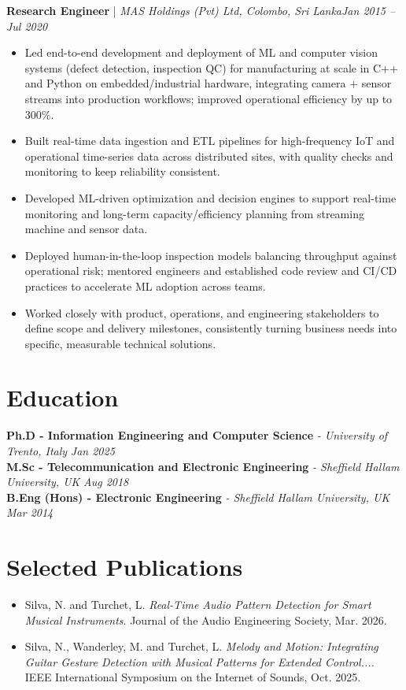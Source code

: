 \documentclass[11pt]{article}
\newenvironment{cvrole}[5]{%
  \par\noindent\textbf{\large #1} | \textit{\small #2, #3}\hfill \textit{\small #4 -- #5}\par
  \begin{itemize}[leftmargin=2em, itemsep=-0.3em, topsep=-0.5em]%
}{%
  \end{itemize}\par\noindent\mbox{}\par\vspace{0.1em}%
}
\begin{document}
\begin{cvrole}{Research Engineer}{MAS Holdings (Pvt) Ltd}{Colombo, Sri Lanka}{Jan 2015}{Jul 2020}
    \item Led end-to-end development and deployment of ML and computer vision systems (defect detection, inspection QC) for manufacturing at scale in C++ and Python on embedded/industrial hardware, integrating camera + sensor streams into production workflows; improved operational efficiency by up to 300\%.
    \item Built real-time data ingestion and ETL pipelines for high-frequency IoT and operational time-series data across distributed sites, with quality checks and monitoring to keep reliability consistent.
    \item Developed ML-driven optimization and decision engines to support real-time monitoring and long-term capacity/efficiency planning from streaming machine and sensor data.
    \item Deployed human-in-the-loop inspection models balancing throughput against operational risk; mentored engineers and established code review and CI/CD practices to accelerate ML adoption across teams.
    \item Worked closely with product, operations, and engineering stakeholders to define scope and delivery milestones, consistently turning business needs into specific, measurable technical solutions.
\end{cvrole}

\section*{Education}
\noindent\textbf{Ph.D - Information Engineering and Computer Science} \textit{\small{ - University of Trento, Italy}} \hfill \textit{Jan 2025}\\[2pt]
\noindent\textbf{M.Sc - Telecommunication and Electronic Engineering} \textit{\small{ - Sheffield Hallam University, UK}} \hfill \textit{Aug 2018}\\[2pt]
\noindent\textbf{B.Eng (Hons) - Electronic Engineering} \textit{\small{ - Sheffield Hallam University, UK}} \hfill \textit{Mar 2014}

\section*{Selected Publications \footnotesize {}}
\begin{itemize}[leftmargin=1.2em, itemsep=-0.25em]
    \item Silva, N. and Turchet, L. \textit{Real-Time Audio Pattern Detection for Smart Musical Instruments}. Journal of the Audio Engineering Society, Mar. 2026.
    \item Silva, N., Wanderley, M. and Turchet, L. \textit{Melody and Motion: Integrating Guitar Gesture Detection with Musical Patterns for Extended Control....} IEEE International Symposium on the Internet of Sounds, Oct. 2025.
\end{itemize}
\end{document}
